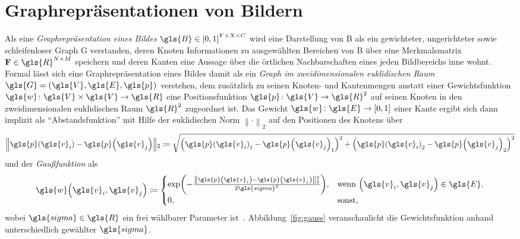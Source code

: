 \chapter{Graphrepräsentationen von Bildern}
\label{graphrepraesentationen_von_bildern}

Als eine \emph{Graphrepräsentation eines Bildes} $\gls{B} \in {\left[0, 1\right]}^{Y \times X \times C}$ wird eine Darstellung von \gls{B} als ein gewichteter, ungerichteter sowie schleifenloser Graph \gls{G} verstanden, deren Knoten Informationen zu ausgewählten Bereichen von \gls{B} über eine Merkmalsmatrix $\ma{F} \in \gls{R}^{N \times M}$ speichern und deren Kanten eine Aussage über die örtlichen Nachbarschaften eines jeden Bildbereichs inne wohnt.
Formal lässt sich eine Graphrepräsentation eines Bildes damit als ein \emph{Graph im zweidimensionalen euklidischen Raum} $\gls{G} = \left(\gls{V}, \gls{E}, \gls{p}\right)$ verstehen, dem zusätzlich zu seinen Knoten- und Kantenmengen anstatt einer Gewichtsfunktion $\gls{w} \colon \gls{V} \times \gls{V} \to \gls{R}$ eine Positionsfunktion $\gls{p} \colon \gls{V} \to \gls{R}^2$ auf seinen Knoten in den zweidimensionalen euklidischen Raum $\gls{R}^2$ zugeordnet ist.
Das Gewicht $\gls{w} \colon \gls{E} \to \left[0, 1\right]$ einer Kante ergibt sich dann implizit als \enquote{Abstandsfunktion} mit Hilfe der euklidischen Norm $\left\|\cdot\right\|_2$ auf den Positionen des Knotens über
\begin{equation*}
  \left\|\gls{p}\left(\gls{v}_i\right) - \gls{p}\left(\gls{v}_j\right) \right\|_2 \coloneqq \sqrt{{\left({\gls{p}\left(\gls{v}_i\right)}_1 - {\gls{p}\left(\gls{v}_j\right)}_1\right)}^2 + {\left({\gls{p}\left(\gls{v}_i\right)}_2 - {\gls{p}\left(\gls{v}_j\right)}_2\right)}^2}
\end{equation*}
und der \emph{Gaußfunktion} als
\begin{equation}
  \gls{w}\left(\gls{v}_i, \gls{v}_j\right) \coloneqq \begin{cases}
    \exp\left(-\frac{\left\|\gls{p}\left(\gls{v}_i\right) - \gls{p}\left(\gls{v}_j\right)\right\|_2^2}{2\gls{sigma}^2}\right), & \text{wenn }\left(\gls{v}_i, \gls{v}_j\right) \in \gls{E},\\
    0, & \text{sonst},
  \end{cases}
  \label{gauss}
\end{equation}
wobei $\gls{sigma} \in \gls{R}$ ein frei wählbarer Parameter ist~\cite{Shuman}.
Abbildung~\ref{fig:gauss} veranschaulicht die Gewichtsfunktion anhand unterschiedlich gewählter $\gls{sigma}$.

